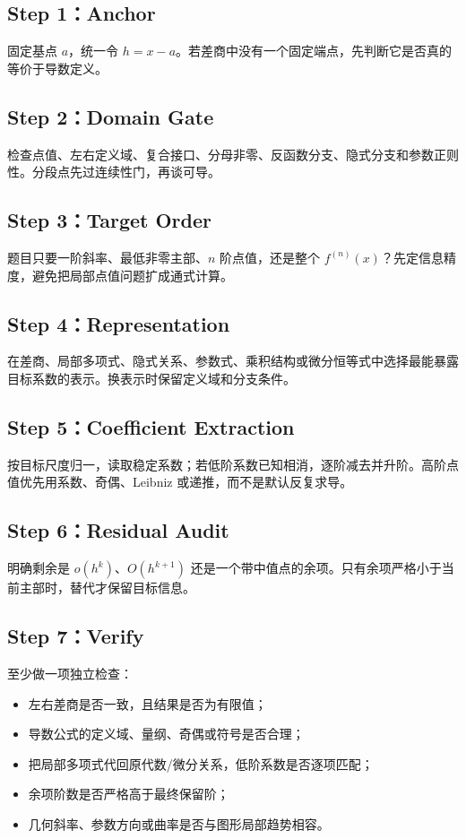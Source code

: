 \documentclass[11pt,a4paper]{ctexart}
\begin{document}
\subsection{Step 1：Anchor}

固定基点 $a$，统一令 $h=x-a$。若差商中没有一个固定端点，先判断它是否真的等价于导数定义。

\subsection{Step 2：Domain Gate}

检查点值、左右定义域、复合接口、分母非零、反函数分支、隐式分支和参数正则性。分段点先过连续性门，再谈可导。

\subsection{Step 3：Target Order}

题目只要一阶斜率、最低非零主部、$n$ 阶点值，还是整个 $f^{(n)}(x)$？先定信息精度，避免把局部点值问题扩成通式计算。

\subsection{Step 4：Representation}

在差商、局部多项式、隐式关系、参数式、乘积结构或微分恒等式中选择最能暴露目标系数的表示。换表示时保留定义域和分支条件。

\subsection{Step 5：Coefficient Extraction}

按目标尺度归一，读取稳定系数；若低阶系数已知相消，逐阶减去并升阶。高阶点值优先用系数、奇偶、Leibniz 或递推，而不是默认反复求导。

\subsection{Step 6：Residual Audit}

明确剩余是 $o(h^k)$、$O(h^{k+1})$ 还是一个带中值点的余项。只有余项严格小于当前主部时，替代才保留目标信息。

\subsection{Step 7：Verify}

至少做一项独立检查：
\begin{itemize}
  \item 左右差商是否一致，且结果是否为有限值；
  \item 导数公式的定义域、量纲、奇偶或符号是否合理；
  \item 把局部多项式代回原代数/微分关系，低阶系数是否逐项匹配；
  \item 余项阶数是否严格高于最终保留阶；
  \item 几何斜率、参数方向或曲率是否与图形局部趋势相容。
\end{itemize}
\end{document}
